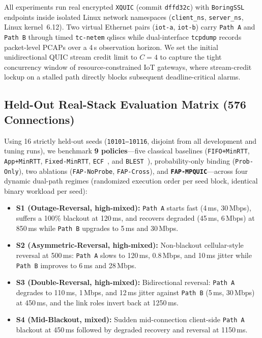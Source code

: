 \documentclass[preprint,12pt,number]{elsarticle}
\begin{document}
All experiments run real encrypted \texttt{XQUIC} (commit \texttt{dffd32c}) with \texttt{BoringSSL} endpoints inside isolated Linux network namespaces (\texttt{client\_ns}, \texttt{server\_ns}, Linux kernel~6.12). Two virtual Ethernet pairs (\texttt{iot-a}, \texttt{iot-b}) carry \texttt{Path~A} and \texttt{Path~B} through timed \texttt{tc-netem} qdiscs while dual-interface \texttt{tcpdump} records packet-level PCAPs over a 4\,s observation horizon. We set the initial unidirectional QUIC stream credit limit to $C{=}4$ to capture the tight concurrency window of resource-constrained IoT gateways, where stream-credit lockup on a stalled path directly blocks subsequent deadline-critical alarms.

\subsection{Held-Out Real-Stack Evaluation Matrix (576 Connections)}
Using 16 strictly held-out seeds (\texttt{10101--10116}, disjoint from all development and tuning runs), we benchmark \textbf{9 policies}---five classical baselines (\texttt{FIFO+MinRTT}, \texttt{App+MinRTT}, \texttt{Fixed-MinRTT}, \texttt{ECF}~\cite{lim2017ecf}, and \texttt{BLEST}~\cite{ferlin2016blest}), probability-only binding (\texttt{Prob-Only}), two ablations (\texttt{FAP-NoProbe}, \texttt{FAP-Cross}), and \textbf{\texttt{FAP-MPQUIC}}---across four dynamic dual-path regimes (randomized execution order per seed block, identical binary workload per seed):
\begin{itemize}
    \item \textbf{S1 (Outage-Reversal, high-mixed):} \texttt{Path~A} starts fast (4\,ms, 30\,Mbps), suffers a 100\% blackout at 120\,ms, and recovers degraded (45\,ms, 6\,Mbps) at 850\,ms while \texttt{Path~B} upgrades to 5\,ms and 30\,Mbps.
    \item \textbf{S2 (Asymmetric-Reversal, high-mixed):} Non-blackout cellular-style reversal at 500\,ms: \texttt{Path~A} slows to 120\,ms, 0.8\,Mbps, and 10\,ms jitter while \texttt{Path~B} improves to 6\,ms and 28\,Mbps.
    \item \textbf{S3 (Double-Reversal, high-mixed):} Bidirectional reversal: \texttt{Path~A} degrades to 110\,ms, 1\,Mbps, and 12\,ms jitter against \texttt{Path~B} (5\,ms, 30\,Mbps) at 450\,ms, and the link roles invert back at 1250\,ms.
    \item \textbf{S4 (Mid-Blackout, mixed):} Sudden mid-connection client-side \texttt{Path~A} blackout at 450\,ms followed by degraded recovery and reversal at 1150\,ms.
\end{itemize}
\end{document}
